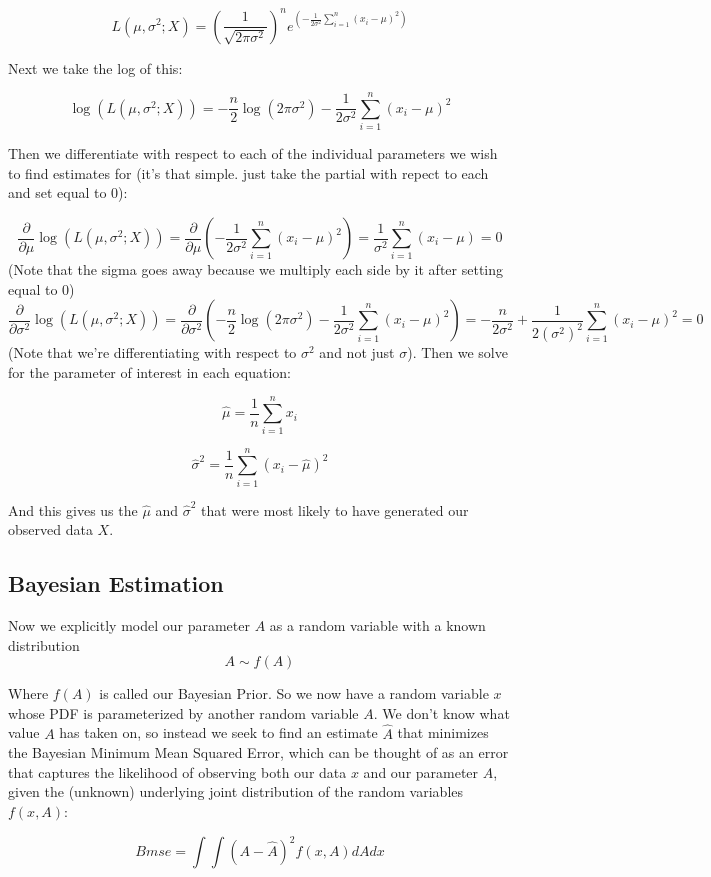 \documentclass[12pt]{article}
\begin{document}
\[L(\mu, \sigma^2; X) = \left(\frac{1}{\sqrt{2\pi\sigma^2}}\right)^n e^{\left( -\frac{1}{2\sigma^2}\sum_{i=1}^n (x_i-\mu)^2\right)}\]

Next we take the log of this:

\[
\log(L(\mu, \sigma^2; X)) = -\frac{n}{2}\log(2\pi\sigma^2) -\frac{1}{2\sigma^2}\sum_{i=1}^n (x_i-\mu)^2
\]

Then we differentiate with respect to each of the individual parameters we wish to find estimates for (it's that simple. just take the partial with repect to each and set equal to 0):

\[
\frac{\partial}{\partial \mu}\log(L(\mu, \sigma^2; X)) = \frac{\partial}{\partial \mu} \left( -\frac{1}{2\sigma^2}\sum_{i=1}^n (x_i-\mu)^2\right) = \frac{1}{\sigma^2}\sum_{i=1}^n (x_i-\mu) = 0
\]
(Note that the sigma goes away because we multiply each side by it after setting equal to 0)
\[
\frac{\partial}{\partial \sigma^2}\log(L(\mu, \sigma^2; X)) = \frac{\partial}{\partial \sigma^2}\left( -\frac{n}{2}\log(2\pi\sigma^2) -\frac{1}{2\sigma^2}\sum_{i=1}^n (x_i-\mu)^2 \right) = -\frac{n}{2\sigma^2} + \frac{1}{2(\sigma^2)^2}\sum_{i=1}^n(x_i-\mu)^2=0
\]
(Note that we're differentiating with respect to \(\sigma^2\) and not just \(\sigma\)). Then we solve for the parameter of interest in each equation:

\[\hat{\mu}=\frac{1}{n}\sum_{i=1}^nx_i\]

\[\hat{\sigma}^2 = \frac{1}{n}\sum_{i=1}^n (x_i-\hat{\mu})^2\]

And this gives us the \(\hat{\mu}\) and \(\hat{\sigma}^2\) that were most likely to have generated our observed data \(X\).
\subsection{Bayesian Estimation}
Now we explicitly model our parameter \(A\) as a random variable with a known distribution
\[A \sim f(A)\]

Where \(f(A)\) is called our Bayesian Prior. So we now have a random variable \(x\) whose PDF is parameterized by another random variable \(A\). We don't know what value \(A\) has taken on, so instead we seek to find an estimate \(\hat{A}\) that minimizes the Bayesian Minimum Mean Squared Error, which can be thought of as an error that captures the likelihood of observing both our data  \(x\) and our parameter \(A\), given the (unknown) underlying joint distribution of the random variables \(f(x,A)\):

\[Bmse = \int \int \left(A - \hat{A}\right)^2 f(x, A)dAdx\]
\end{document}

